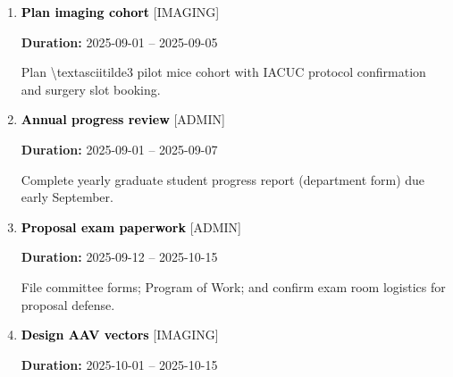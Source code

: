 \documentclass[landscape,a4paper]{article}
\begin{document}
\begin{enumerate}[leftmargin=1.5cm, itemsep=1em]
    \item \textcolor{black}{\textbf{\large Plan imaging cohort}}
          \hfill \textcolor{black!60}{\small [IMAGING]}
          
          \vspace{0.2em}
          \textcolor{black!70}{\textbf{Duration:} 2025-09-01 -- 2025-09-05}

          \vspace{0.4em}
          \begin{minipage}[t]{0.9\textwidth}
          \textcolor{black!85}{Plan \textbackslash{}textasciitilde{}3 pilot mice cohort with IACUC protocol confirmation and surgery slot booking.}
          \end{minipage}


    \item \textcolor{black}{\textbf{\large Annual progress review}}
          \hfill \textcolor{black!60}{\small [ADMIN]}
          
          \vspace{0.2em}
          \textcolor{black!70}{\textbf{Duration:} 2025-09-01 -- 2025-09-07}

          \vspace{0.4em}
          \begin{minipage}[t]{0.9\textwidth}
          \textcolor{black!85}{Complete yearly graduate student progress report (department form) due early September.}
          \end{minipage}


    \item \textcolor{black}{\textbf{\large Proposal exam paperwork}}
          \hfill \textcolor{black!60}{\small [ADMIN]}
          
          \vspace{0.2em}
          \textcolor{black!70}{\textbf{Duration:} 2025-09-12 -- 2025-10-15}

          \vspace{0.4em}
          \begin{minipage}[t]{0.9\textwidth}
          \textcolor{black!85}{File committee forms; Program of Work; and confirm exam room logistics for proposal defense.}
          \end{minipage}


    \item \textcolor{black}{\textbf{\large Design AAV vectors}}
          \hfill \textcolor{black!60}{\small [IMAGING]}
          
          \vspace{0.2em}
          \textcolor{black!70}{\textbf{Duration:} 2025-10-01 -- 2025-10-15}


\end{enumerate}
\end{document}
